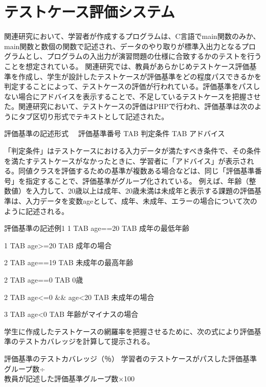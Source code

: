 \documentclass{tpu-sotu}
\begin{document}
\section{テストケース評価システム}
関連研究において、学習者が作成するプログラムは、C言語でmain関数のみか、main関数と数個の関数で記述され、データのやり取りが標準入出力となるプログラムとし、プログラムの入出力が演習問題の仕様に合致するかのテストを行うことを想定されている。
関連研究では、教員があらかじめテストケース評価基準を作成し、学生が設計したテストケースが評価基準をどの程度パスできるかを判定することによって、テストケースの評価が行われている。評価基準をパスしない場合にアドバイスを表示することで、不足しているテストケースを把握させた。関連研究において、テストケースの評価はPHPで行われ、評価基準は次のようにタブ区切り形式でテキストとして記述された。

\begin{minipage}[b]{.7\textwidth}
\begin{itembox}[l]{評価基準の記述形式}
　評価基準番号 TAB 判定条件 TAB アドバイス
\end{itembox}
\end{minipage}

「判定条件」はテストケースにおける入力データが満たすべき条件で、その条件を満たすテストケースがなかったときに、学習者に「アドバイス」が表示される。同値クラスを評価するための基準が複数ある場合などは、同じ「評価基準番号」を指定することで、評価基準がグループ化されている。
例えば、年齢（整数値）を入力して、20歳以上は成年、20歳未満は未成年と表示する課題の評価基準は、入力データを変数ageとして、成年、未成年、エラーの場合について次のように記述される。

\begin{minipage}[b]{.7\textwidth}
\begin{itembox}[l]{評価基準の記述例1}
1 TAB age==20 TAB 成年の最低年齢

1 TAB age>=20 TAB 成年の場合

2 TAB age==19 TAB 未成年の最高年齢

2 TAB age==0 TAB 0歳

2 TAB age<=0 \&\& age<20 TAB 未成年の場合

3 TAB age<0 TAB 年齢がマイナスの場合
\end{itembox}
\end{minipage}

学生に作成したテストケースの網羅率を把握させるために、次の式により評価基準のテストカバレッジを計算して提示される。

\begin{minipage}[b]{.7\textwidth}
\begin{itembox}[l]{評価基準のテストカバレッジ（％）}
学習者のテストケースがパスした評価基準グループ数÷\\教員が記述した評価基準グループ数×100
\end{itembox}
\end{minipage}
\end{document}
